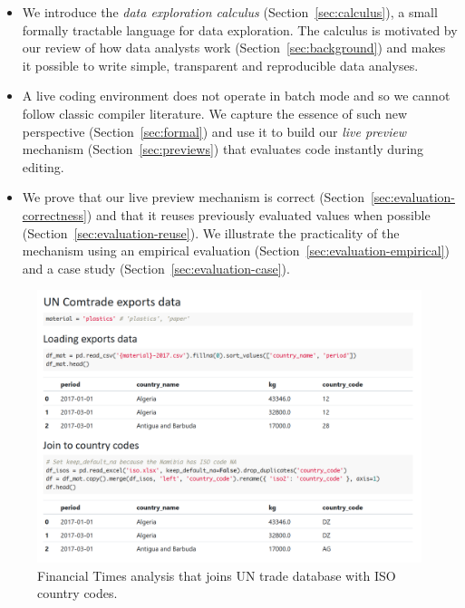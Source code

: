\documentclass[english,submission]{programming}
\theoremstyle{plain}
\theoremstyle{definition}
\begin{document}
\begin{itemize}
\item We introduce the \emph{data exploration calculus} (Section~\ref{sec:calculus}), a small formally
  tractable language for data exploration. The calculus is motivated by our review
  of how data analysts work (Section~\ref{sec:background}) and makes it possible to write simple,
  transparent and reproducible data analyses.

\item A live coding environment does not operate in batch mode and so we cannot follow classic
  compiler literature. We capture the essence of such new perspective (Section~\ref{sec:formal})
  and use it to build our \emph{live preview} mechanism (Section~\ref{sec:previews}) that evaluates
  code instantly during editing.

\item We prove that our live preview mechanism is correct (Section~\ref{sec:evaluation-correctness}) and that
  it reuses previously evaluated values when possible (Section~\ref{sec:evaluation-reuse}). We
  illustrate the practicality of the mechanism using an empirical evaluation
  (Section~\ref{sec:evaluation-empirical}) and a case study (Section~\ref{sec:evaluation-case}).
\end{itemize}


\begin{figure}
\vspace{-1em}
\hspace{1em}\includegraphics[scale=0.52]{figures/notebook.png}
\vspace{-0.5em}
\caption{Financial Times analysis that joins UN trade database with ISO country codes.}
\label{fig:ft-uncomtrade}
\vspace{-0.5em}
\end{figure}
\end{document}
